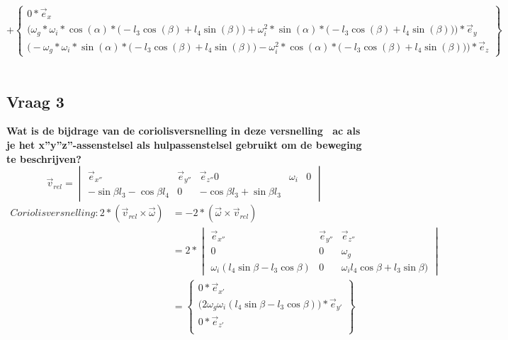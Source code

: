 \documentclass[a4paper,10pt]{article}
\begin{document}
\begin{equation}
+ \begin{Bmatrix}
	{0*\vec{e}_{x}}\\
	\Big(\omega_g * \omega_i*\cos(\alpha)*\Big( - l_3 \cos(\beta) + l_4 \sin(\beta)\Big) + \omega_i^2*\sin(\alpha)*\Big( - l_3 \cos(\beta) + l_4 \sin(\beta)\Big)\Big) *\vec{e}_{y}\\
	\Big(-\omega_g * \omega_i*\sin(\alpha)*\Big( - l_3 \cos(\beta) + l_4 \sin(\beta)\Big) - \omega_i^2*\cos(\alpha)*\Big( - l_3 \cos(\beta) + l_4 \sin(\beta)\Big)\Big)*\vec{e}_{z} 
\end{Bmatrix}
\end{equation}\\	

\subsection{Vraag 3}
\textbf{Wat is de bijdrage van de coriolisversnelling in deze versnelling ~ac als je het x”y”z”-assenstelsel als hulpassenstelsel gebruikt om de beweging te beschrijven?}
\begin{equation}
\vec{v}_{rel} =\begin{vmatrix}
\vec{e}_{x''} & \vec{e}_{y''} & \vec{e}_{z''}
0 & \omega_i & 0\\
-\sin{\beta}l_3 - \cos{\beta} l_4 & 0 &-\cos{\beta} l_3 + \sin{\beta} l_3
\end{vmatrix}
\end{equation}
\begin{equation}
\begin{aligned}
	Coriolisversnelling: 2*( \vec{v}_{rel} \times  \vec{\omega}) &= -2 *( \vec{\omega} \times \vec{v}_{rel})\\
	&=2 * \begin{vmatrix}
	\vec{e}_{x''} & \vec{e}_{y''} & \vec{e}_{z''}\\
	0 & 0 & \omega_g \\
	\omega_i  (l_4 \sin{\beta}-l_3  \cos{\beta}) & 0 & \omega_i l_4\cos{\beta} + l_3  \sin{\beta})
	\end{vmatrix}\\
	&= \begin{Bmatrix}
	0 * \vec{e}_{x'}\\
	\Big(2\omega_g\omega_i(l_4 \sin{\beta}-l_3  \cos{\beta})\Big)*\vec{e}_{y'}\\
	0 * \vec{e}_{z'}\\
	\end{Bmatrix}
\end{aligned}
\end{equation}
\end{document}
